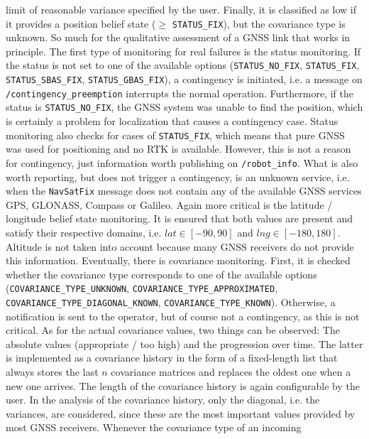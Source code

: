 \documentclass[english, master, utf8]{base/thesis_KBS}
\newcommand{\code}[1]{\colorbox{light-gray}{\texttt{#1}}}
\begin{document}
limit of reasonable variance specified by the user. Finally, it is classified as low if it provides a position belief state ($\geq$ \code{STATUS\_FIX}), but the covariance type
is unknown. So much for the qualitative assessment of a GNSS link that works in principle.\newline
The first type of monitoring for real failures is the status monitoring. If the status is not set to one of the available options (\code{STATUS\_NO\_FIX}, \code{STATUS\_FIX},
\code{STATUS\_SBAS\_FIX}, \code{STATUS\_GBAS\_FIX}), a contingency is initiated, i.e. a message on \code{/contingency\_preemption} interrupts the normal operation.
Furthermore, if the status is \code{STATUS\_NO\_FIX}, the GNSS system was unable to find the position, which is certainly a problem for localization that causes a contingency
case. Status monitoring also checks for cases of \code{STATUS\_FIX}, which means that pure GNSS was used for positioning and no RTK is available. However, this is not a reason for
contingency, just information worth publishing on \code{/robot\_info}. What is also worth reporting, but does not trigger a contingency, is an unknown service, i.e. when the
\code{NavSatFix} message does not contain any of the available GNSS services GPS, GLONASS, Compass or Galileo. Again more critical is the latitude / longitude belief state
monitoring. It is ensured that both values are present and satisfy their respective domains, i.e. $lat \in [-90, 90]$ and $lng \in [-180, 180]$. Altitude is not taken into account
because many GNSS receivers do not provide this information. Eventually, there is covariance monitoring. First, it is checked whether the covariance type corresponds to one of the
available options (\code{COVARIANCE\_TYPE\_UNKNOWN}, \code{COVARIANCE\_TYPE\_APPROXIMATED}, \code{COVARIANCE\_TYPE\_DIAGONAL\_KNOWN}, \code{COVARIANCE\_TYPE\_KNOWN}). Otherwise,
a notification is sent to the operator, but of course not a contingency, as this is not critical. As for the actual covariance values, two things can be observed: The absolute values
(appropriate / too high) and the progression over time. The latter is implemented as a covariance history in the form of a fixed-length list that always stores the last $n$
covariance matrices and replaces the oldest one when a new one arrives. The length of the covariance history is again configurable by the user. In the analysis of the covariance
history, only the diagonal, i.e. the variances, are considered, since these are the most important values provided by most GNSS receivers. Whenever the covariance type of an incoming
\end{document}
